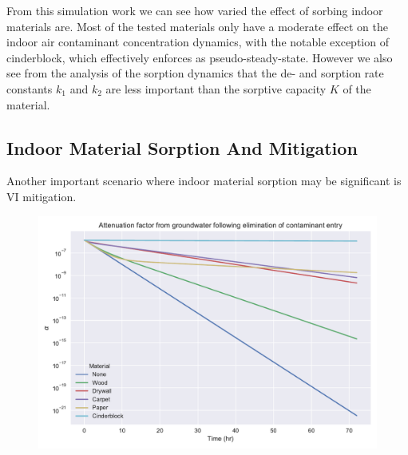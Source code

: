 From this simulation work we can see how varied the effect of sorbing indoor materials are.
Most of the tested materials only have a moderate effect on the indoor air contaminant concentration dynamics, with the notable exception of cinderblock, which effectively enforces as pseudo-steady-state.
However we also see from the analysis of the sorption dynamics that the de- and sorption rate constants $k_1$ and $k_2$ are less important than the sorptive capacity $K$ of the material.\par

\subsection{Indoor Material Sorption And Mitigation}\label{sec:results_indoor_mitigation}

Another important scenario where indoor material sorption may be significant is VI mitigation.


\begin{figure}[!htb]
  \includegraphics[width=\textwidth]{sorption_mitigation.pdf}
  \caption{}
  \label{fig:sorption_mitigation}
\end{figure}
